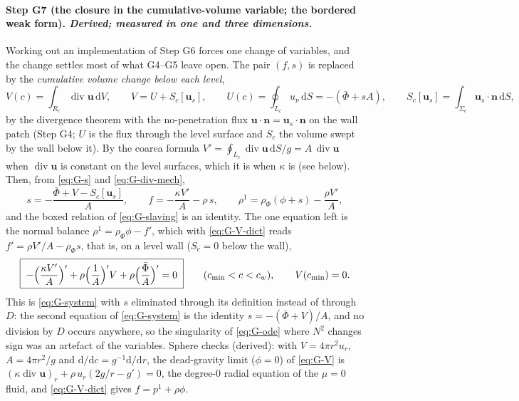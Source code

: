 \documentclass[11pt]{article}
\newcommand{\bu}{\mathbf{u}}
\newcommand{\bn}{\mathbf{n}}
\newcommand{\dS}{\,\mathrm{d}S}
\newcommand{\dV}{\,\mathrm{d}V}
\newcommand{\Div}{\operatorname{div}}
\begin{document}
\paragraph{Step G7 (the closure in the cumulative-volume variable;
the bordered weak form). \emph{Derived; measured in one and three
dimensions.}}
Working out an implementation of Step G6 forces one change of
variables, and the change settles most of what G4--G5 leave open. The
pair $(f, s)$ is replaced by the \emph{cumulative volume change below
each level},
\begin{equation}
  V(c) = \int_{R_c}\Div\bu\dV ,
  \qquad
  V = U + S_c[\bu_s],
  \qquad
  U(c) = \oint_{L_c}u_\nu\dS = -(\bar\Phi + sA),
  \qquad
  S_c[\bu_s] = \int_{\Sigma_c}\bu_s\cdot\bn\dS ,
  \label{eq:G-V-def}
\end{equation}
by the divergence theorem with the no-penetration flux $\bu\cdot\bn =
\bu_s\cdot\bn$ on the wall patch (Step G4; $U$ is the flux through the
level surface and $S_c$ the volume swept by the wall below it). By the
coarea formula $V' = \oint_{L_c}\Div\bu\,\mathrm dS/g = A\,\Div\bu$
when $\Div\bu$ is constant on the level surfaces, which it is when
$\kappa$ is (see below). Then, from \eqref{eq:G-s} and
\eqref{eq:G-div-mech},
\begin{equation}
  s = -\frac{\bar\Phi + V - S_c[\bu_s]}{A},
  \qquad
  f = -\frac{\kappa V'}{A} - \rho\,s,
  \qquad
  \rho^1 = \rho_\Phi(\phi + s) - \frac{\rho V'}{A},
  \label{eq:G-V-dict}
\end{equation}
and the boxed relation of \eqref{eq:G-slaving} is an identity. The one
equation left is the normal balance $\rho^1 = \rho_\Phi\phi - f'$,
which with \eqref{eq:G-V-dict} reads $f' = \rho V'/A - \rho_\Phi s$,
that is, on a level wall ($S_c = 0$ below the wall),
\begin{equation}
  \boxed{\;-\Bigl(\frac{\kappa V'}{A}\Bigr)' + \rho\Bigl(\frac1A\Bigr)'V
  + \rho\Bigl(\frac{\bar\Phi}{A}\Bigr)' = 0\;}
  \qquad (c_{\min} < c < c_w),
  \qquad V(c_{\min}) = 0 .
  \label{eq:G-V}
\end{equation}
This is \eqref{eq:G-system} with $s$ eliminated through its
definition instead of through $D$: the second equation of
\eqref{eq:G-system} is the identity $s = -(\bar\Phi + V)/A$, and no
division by $D$ occurs anywhere, so the singularity of
\eqref{eq:G-ode} where $N^2$ changes sign was an artefact of the
variables. Sphere checks (derived): with $V = 4\pi r^2u_r$,
$A = 4\pi r^2/g$ and $\mathrm d/\mathrm dc = g^{-1}\mathrm d/\mathrm dr$,
the dead-gravity limit ($\phi = 0$) of \eqref{eq:G-V} is
$(\kappa\Div\bu)_r + \rho\,u_r(2g/r - g') = 0$, the degree-0 radial
equation of the $\mu = 0$ fluid, and \eqref{eq:G-V-dict} gives
$f = p^1 + \rho\phi$.
\end{document}
